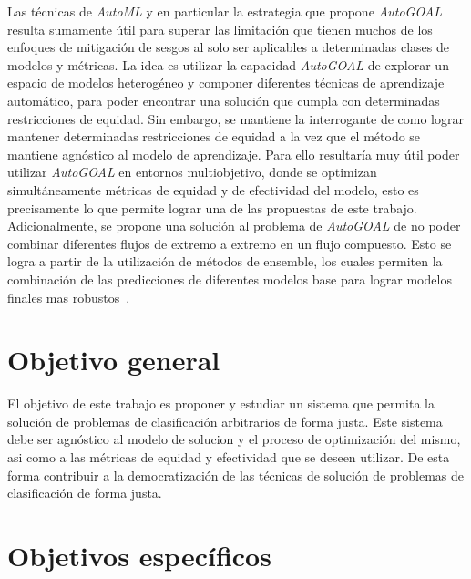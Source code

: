 Las técnicas de \emph{AutoML} y en particular la estrategia que propone \emph{AutoGOAL} resulta sumamente útil para superar las limitación que tienen muchos de los enfoques de mitigación de sesgos al solo ser aplicables a determinadas clases de modelos y métricas.
La idea es utilizar la capacidad \emph{AutoGOAL} de explorar un espacio de modelos heterogéneo y componer diferentes técnicas de aprendizaje automático, para poder encontrar una solución que cumpla con determinadas restricciones de equidad.
Sin embargo, se mantiene la interrogante de como lograr mantener determinadas restricciones de equidad a la vez que el método se mantiene agnóstico al modelo de aprendizaje.
Para ello resultaría muy útil poder utilizar \emph{AutoGOAL} en entornos multiobjetivo, donde se optimizan simultáneamente métricas de equidad y de efectividad del modelo, esto es precisamente lo que permite lograr una de las propuestas de este trabajo.
Adicionalmente, se propone una solución al problema de \emph{AutoGOAL} de no poder combinar diferentes flujos de extremo a extremo en un flujo compuesto.
Esto se logra a partir de la utilización de métodos de ensemble, los cuales permiten la combinación de las predicciones de diferentes modelos base para lograr modelos finales mas robustos~\parencite{polikar2006ensemble}.


\section*{Objetivo general}

El objetivo de este trabajo es proponer y estudiar un sistema que permita la solución de problemas de clasificación arbitrarios de forma justa.
Este sistema debe ser agnóstico al modelo de solucion y el proceso de optimización del mismo, asi como a las métricas de equidad y efectividad que se deseen utilizar.
De esta forma contribuir a la democratización de las técnicas de solución de problemas de clasificación de forma justa.

\section*{Objetivos específicos}

